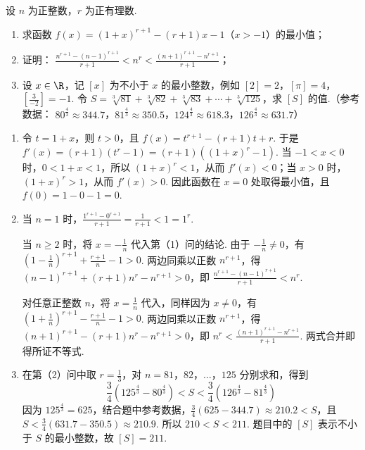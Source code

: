 \begin{problem}
设 \(n\) 为正整数，\(r\) 为正有理数.
\begin{enumerate}
\item 求函数 \( f(x) = (1 + x)^{r + 1} - (r + 1)x - 1 \)（\(x > -1\)）的最小值；
\item 证明： \(\frac{n^{r+1} - (n-1)^{r+1}}{r+1} < n^{r} < \frac{(n+1)^{r+1} - n^{r+1}}{r+1}\)；
\item 设 \(x \in \R\)，记 \([x]\) 为不小于 \(x\) 的最小整数，例如 \([2] = 2\)，\([\pi] = 4\)，\(\left[\frac{3}{-2}\right] = -1\). 令 \(S = \sqrt[3]{81} + \sqrt[3]{82} + \sqrt[3]{83} + \cdots + \sqrt[3]{125}\)，求 \([S]\) 的值.（参考数据： \(80^{\frac{4}{3}} \approx 344.7\)，\(81^{\frac{4}{3}} \approx 350.5\)，\(124^{\frac{4}{3}} \approx 618.3\)，\(126^{\frac{4}{3}} \approx 631.7\)）
\end{enumerate}
\end{problem}

\begin{solution}
\begin{enumerate}
\item 令 \(t=1+x\)，则 \(t>0\)，且 \(f(x)=t^{r+1}-(r+1)t+r\). 于是 \(f'(x)=(r+1)(t^r-1)=(r+1)((1+x)^r-1)\).
当 \(-1<x<0\) 时，\(0<1+x<1\)，所以 \((1+x)^r<1\)，从而 \(f'(x)<0\)；当 \(x>0\) 时，\((1+x)^r>1\)，从而 \(f'(x)>0\). 因此函数在 \(x=0\) 处取得最小值，且
\(f(0)=1-0-1=0\).

\item 当 \(n=1\) 时，\(\frac{1^{r+1}-0^{r+1}}{r+1}=\frac{1}{r+1}<1=1^r\).

当 \(n\geqslant2\) 时，将 \(x=-\frac{1}{n}\) 代入第（1）问的结论. 由于 \(-\frac{1}{n}\neq0\)，有 \(\left(1-\frac{1}{n}\right)^{r+1}+\frac{r+1}{n}-1>0\). 两边同乘以正数 \(n^{r+1}\)，得 \((n-1)^{r+1}+(r+1)n^r-n^{r+1}>0\)，即 \(\frac{n^{r+1}-(n-1)^{r+1}}{r+1}<n^r\).

对任意正整数 \(n\)，将 \(x=\frac{1}{n}\) 代入，同样因为 \(x\neq0\)，有 \(\left(1+\frac{1}{n}\right)^{r+1}-\frac{r+1}{n}-1>0\). 两边同乘以正数 \(n^{r+1}\)，得 \((n+1)^{r+1}-(r+1)n^r-n^{r+1}>0\)，即 \(n^r<\frac{(n+1)^{r+1}-n^{r+1}}{r+1}\).
两式合并即得所证不等式.

\item 在第（2）问中取 \(r=\frac{1}{3}\)，对 \(n=81\)，\(82\)，\(\ldots\)，\(125\) 分别求和，得到
\[
\frac{3}{4}\left(125^{\frac{4}{3}}-80^{\frac{4}{3}}\right)
<S<
\frac{3}{4}\left(126^{\frac{4}{3}}-81^{\frac{4}{3}}\right)
\]
因为 \(125^{\frac{4}{3}}=625\)，结合题中参考数据，\(\frac{3}{4}(625-344.7)\approx210.2<S\)，且 \(S<\frac{3}{4}(631.7-350.5)\approx210.9\).
所以 \(210<S<211\). 题目中的 \([S]\) 表示不小于 \(S\) 的最小整数，故 \([S]=211\).
\end{enumerate}
\end{solution}
